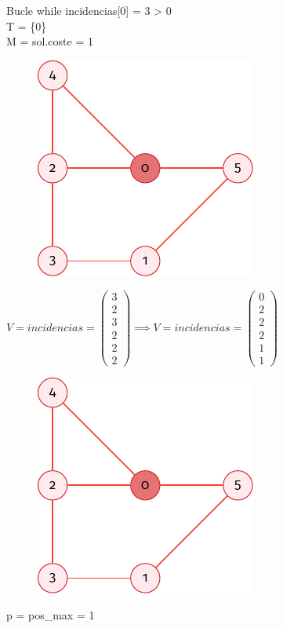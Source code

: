 \documentclass[spanish]{beamer}
\begin{document}
\begin{frame}{Bucle while}
	incidencias[0] = 3 > 0\\
	T = \{0\}\\
	M = sol.coste = 1
	\begin{figure}[H]
		\centering \includegraphics{./img/grafo-ejemplo-1.pdf}
	\end{figure}
\end{frame}

\begin{frame}{}
	$\displaystyle  V = incidencias =
	\begin{pmatrix}
	  3 \\
	  2 \\
	  3 \\
	  2 \\
	  2 \\
	  2
	\end{pmatrix} \implies  V = incidencias =
	\begin{pmatrix}
	  0 \\
	  2 \\
	  2 \\
	  2 \\
	  1 \\
	  1
	\end{pmatrix}$

	\begin{figure}[H]
		\centering \includegraphics{./img/grafo-ejemplo-1.pdf}
	\end{figure}
	p = pos\_max = 1

\end{frame}
\end{document}
